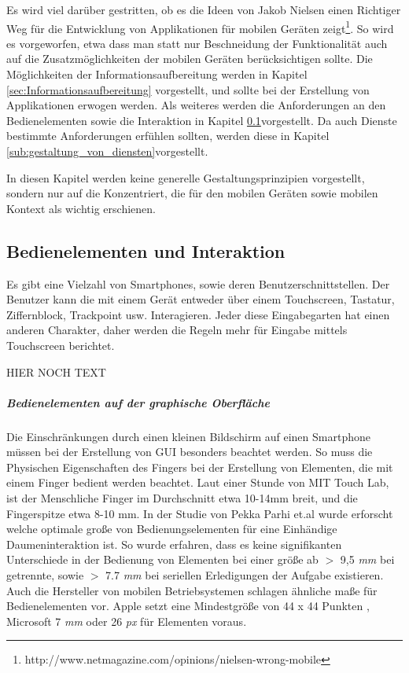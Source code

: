Es wird viel darüber gestritten, ob es die Ideen von Jakob Nielsen einen Richtiger Weg für die Entwicklung von Applikationen für mobilen Geräten zeigt\footnote{http://www.netmagazine.com/opinions/nielsen-wrong-mobile}. So wird es vorgeworfen, etwa dass man statt nur Beschneidung der Funktionalität auch auf die Zusatzmöglichkeiten der mobilen Geräten berücksichtigen sollte. Die Möglichkeiten der Informationsaufbereitung werden in Kapitel \ref{sec:Informationsaufbereitung} vorgestellt, und sollte bei der Erstellung von Applikationen erwogen werden. Als weiteres werden die Anforderungen an den Bedienelementen sowie die Interaktion in Kapitel \ref{sub:Benutzerschnittstellen}vorgestellt. Da auch Dienste bestimmte Anforderungen erfühlen sollten, werden diese in Kapitel \ref{sub:gestaltung_von_diensten}vorgestellt.

In diesen Kapitel werden keine generelle Gestaltungsprinzipien vorgestellt, sondern nur auf die Konzentriert, die für den mobilen Geräten sowie mobilen Kontext als wichtig erschienen.

\subsection{Bedienelementen und Interaktion}
\label{sub:Benutzerschnittstellen}

Es gibt eine Vielzahl von Smartphones, sowie deren Benutzerschnittstellen. Der Benutzer kann die mit einem Gerät entweder über einem Touchscreen, Tastatur, Ziffernblock, Trackpoint usw. Interagieren. Jeder diese Eingabegarten hat einen anderen Charakter, daher werden die Regeln mehr für Eingabe mittels Touchscreen berichtet.

HIER NOCH TEXT

\subparagraph{Bedienelementen auf der graphische Oberfläche} 
\label{subp:gro_ere_interface_elementen}

Die Einschränkungen durch einen kleinen Bildschirm auf einen Smartphone müssen bei der Erstellung von GUI besonders beachtet werden. So muss die Physischen Eigenschaften des Fingers  bei der Erstellung von Elementen, die mit einem Finger bedient werden beachtet. Laut einer Stunde von MIT Touch Lab, ist der Menschliche Finger im Durchschnitt etwa 10-14mm breit, und die Fingerspitze etwa 8-10 mm\cite{Srinivasan:2003uu}. In der Studie von Pekka Parhi et.al \cite{Parhi:2006gh} wurde erforscht welche optimale große von Bedienungselementen für eine Einhändige Daumeninteraktion ist. So wurde erfahren, dass es keine signifikanten Unterschiede in der Bedienung von Elementen bei einer größe ab $>$ 9,5 \textit{mm} bei getrennte, sowie $>$ 7.7 \textit{mm} bei seriellen Erledigungen der Aufgabe existieren. Auch die Hersteller von mobilen Betriebsystemen schlagen ähnliche maße für Bedienelementen vor. Apple setzt eine Mindestgröße von 44 x 44 Punkten \cite{Apple}, Microsoft 7 \textit{mm} oder 26 \textit{px}\cite{lukeGUI} für Elementen voraus.

